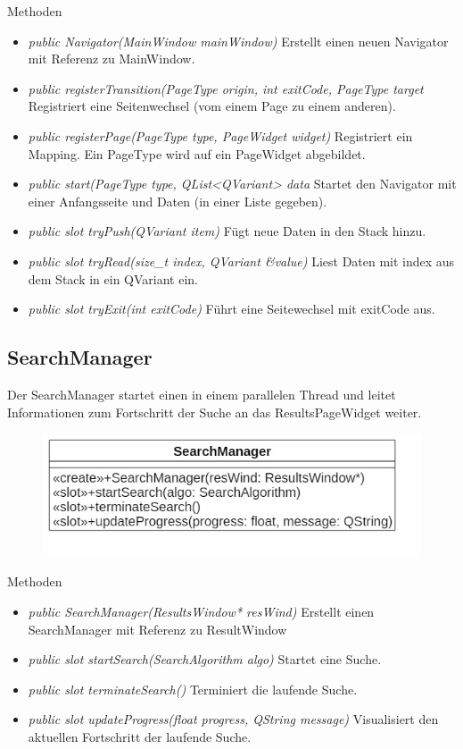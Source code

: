 Methoden
\begin{itemize}
	\item\textit{public Navigator(MainWindow mainWindow)}
	Erstellt einen neuen Navigator mit Referenz zu MainWindow.
	\item\textit{public registerTransition(PageType origin, int exitCode, PageType target}
	Registriert eine Seitenwechsel (vom einem Page zu einem anderen).
	\item\textit{public registerPage(PageType type, PageWidget widget)}
	Registriert ein Mapping. Ein PageType wird auf ein PageWidget abgebildet.
	\item\textit{public start(PageType type, QList<QVariant> data}
	Startet den Navigator mit einer Anfangsseite und Daten (in einer Liste gegeben).
	\item\textit{public slot tryPush(QVariant item) }
	Fügt neue Daten in den Stack hinzu.
	\item\textit{public slot tryRead(size\_t index, QVariant \&value) }
	Liest Daten mit index aus dem Stack in ein QVariant ein.
	\item\textit{public slot tryExit(int exitCode)}
	Führt eine Seitewechsel mit exitCode aus.
	
\end{itemize}

\subsection*{SearchManager}
Der SearchManager startet einen  in einem parallelen Thread und leitet Informationen zum Fortschritt der Suche an das ResultsPageWidget weiter.

\begin{figure}[H]
\centering
\includegraphics[scale=0.5]{img/Klassendiagramm/Klassen/Controller/SearchManager}
\label{fig:searchManager}
\end{figure}

Methoden
\begin{itemize}
	\item\textit{public SearchManager(ResultsWindow* resWind)}
	Erstellt einen SearchManager mit Referenz zu ResultWindow
	\item\textit{public slot startSearch(SearchAlgorithm algo)}
	Startet eine Suche.
	\item\textit{public slot terminateSearch()}
	Terminiert die laufende Suche.
	\item\textit{public slot updateProgress(float progress, QString message)}
	Visualisiert den aktuellen Fortschritt der laufende Suche.
\end{itemize}

